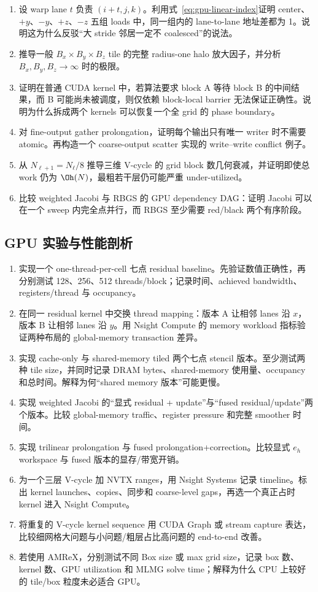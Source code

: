 \begin{enumerate}[label=\arabic*.]
\item 设 warp lane $t$ 负责 $(i+t,j,k)$。利用式~\eqref{eq:gpu-linear-index}证明 center、$+y$、$-y$、$+z$、$-z$ 五组 loads 中，同一组内的 lane-to-lane 地址差都为 1。说明这为什么反驳“大 stride 邻居一定不 coalesced”的说法。
\item 推导一般 $B_x\times B_y\times B_z$ tile 的完整 radius-one halo 放大因子，并分析 $B_x,B_y,B_z\rightarrow\infty$ 时的极限。
\item 证明在普通 CUDA kernel 中，若算法要求 block A 等待 block B 的中间结果，而 B 可能尚未被调度，则仅依赖 block-local barrier 无法保证正确性。说明为什么拆成两个 kernels 可以恢复一个全 grid 的 phase boundary。
\item 对 fine-output gather prolongation，证明每个输出只有唯一 writer 时不需要 atomic。再构造一个 coarse-output scatter 实现的 write--write conflict 例子。
\item 从 $N_{\ell+1}=N_\ell/8$ 推导三维 V-cycle 的 grid block 数几何衰减，并证明即使总 work 仍为 $\Oh(N)$，最粗若干层仍可能严重 under-utilized。
\item 比较 weighted Jacobi 与 RBGS 的 GPU dependency DAG：证明 Jacobi 可以在一个 sweep 内完全点并行，而 RBGS 至少需要 red/black 两个有序阶段。
\end{enumerate}

\subsection*{GPU 实验与性能剖析}
\begin{enumerate}[label=\arabic*.]
\item 实现一个 one-thread-per-cell 七点 residual baseline。先验证数值正确性，再分别测试 128、256、512 threads/block；记录时间、achieved bandwidth、registers/thread 与 occupancy。
\item 在同一 residual kernel 中交换 thread mapping：版本 A 让相邻 lanes 沿 $x$，版本 B 让相邻 lanes 沿 $y$。用 Nsight Compute 的 memory workload 指标验证两种布局的 global-memory transaction 差异。
\item 实现 cache-only 与 shared-memory tiled 两个七点 stencil 版本。至少测试两种 tile size，并同时记录 DRAM bytes、shared-memory 使用量、occupancy 和总时间。解释为何“shared memory 版本”可能更慢。
\item 实现 weighted Jacobi 的“显式 residual + update”与“fused residual/update”两个版本。比较 global-memory traffic、register pressure 和完整 smoother 时间。
\item 实现 trilinear prolongation 与 fused prolongation+correction。比较显式 $e_h$ workspace 与 fused 版本的显存/带宽开销。
\item 为一个三层 V-cycle 加 NVTX ranges，用 Nsight Systems 记录 timeline。标出 kernel launches、copies、同步和 coarse-level gaps，再选一个真正占时 kernel 进入 Nsight Compute。
\item 将重复的 V-cycle kernel sequence 用 CUDA Graph 或 stream capture 表达，比较细网格大问题与小问题/粗层占比高问题的 end-to-end 改善。
\item 若使用 AMReX，分别测试不同 Box size 或 max grid size，记录 box 数、kernel 数、GPU utilization 和 MLMG solve time；解释为什么 CPU 上较好的 tile/box 粒度未必适合 GPU。
\end{enumerate}


